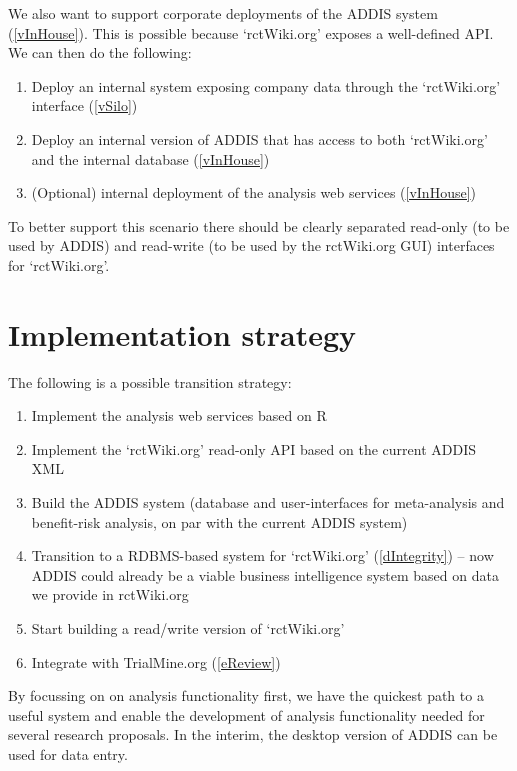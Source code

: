 \documentclass[a4paper]{article}
\begin{document}
We also want to support corporate deployments of the ADDIS system (\ref{vInHouse}). This is possible because `rctWiki.org' exposes a well-defined API. We can then do the following:
\begin{enumerate}
\item Deploy an internal system exposing company data through the `rctWiki.org' interface (\ref{vSilo})
\item Deploy an internal version of ADDIS that has access to both `rctWiki.org' and the internal database (\ref{vInHouse})
\item (Optional) internal deployment of the analysis web services (\ref{vInHouse})
\end{enumerate}
To better support this scenario there should be clearly separated read-only (to be used by ADDIS) and read-write (to be used by the rctWiki.org GUI) interfaces for `rctWiki.org'.

\section{Implementation strategy}
The following is a possible transition strategy:
\begin{enumerate}
\item Implement the analysis web services based on R
\item Implement the `rctWiki.org' read-only API based on the current ADDIS XML
\item Build the ADDIS system (database and user-interfaces for meta-analysis and benefit-risk analysis, on par with the current ADDIS system)
\item Transition to a RDBMS-based system for `rctWiki.org' (\ref{dIntegrity}) -- now ADDIS could already be a viable business intelligence system based on data we provide in rctWiki.org
\item Start building a read/write version of `rctWiki.org'
\item Integrate with TrialMine.org (\ref{eReview})
\end{enumerate}
By focussing on on analysis functionality first, we have the quickest path to a useful system and enable the development of analysis functionality needed for several research proposals.
In the interim, the desktop version of ADDIS can be used for data entry.
\end{document}
